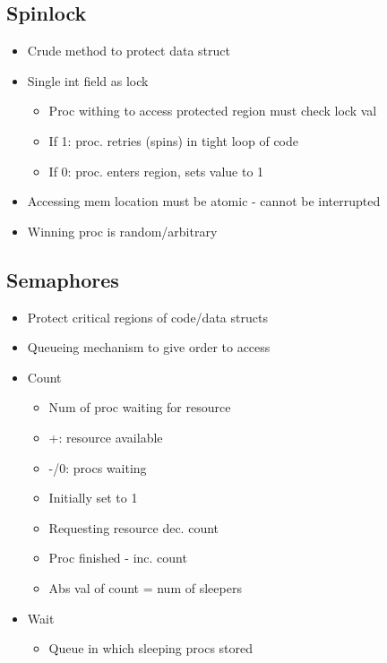 \subsection{Spinlock}

\begin{itemize}
	\item Crude method to protect data struct
	\item Single int field as lock
	\begin{itemize}
		\item Proc withing to access protected region must check lock
			val
		\item If 1: proc. retries (spins) in tight loop of code
		\item If 0: proc. enters region, sets value to 1
	\end{itemize}
	\item Accessing mem location must be atomic - cannot be interrupted
	\item Winning proc is random/arbitrary
\end{itemize}

\subsection{Semaphores}

\begin{itemize}
	\item Protect critical regions of code/data structs
	\item Queueing mechanism to give order to access
	\item Count
	\begin{itemize}
		\item Num of proc waiting for resource
		\item +: resource available
		\item -/0: procs waiting
		\item Initially set to 1
		\item Requesting resource dec. count
		\item Proc finished - inc. count
		\item Abs val of count = num of sleepers
	\end{itemize}
	\item Wait
	\begin{itemize}
		\item Queue in which sleeping procs stored
	\end{itemize}
\end{itemize}

